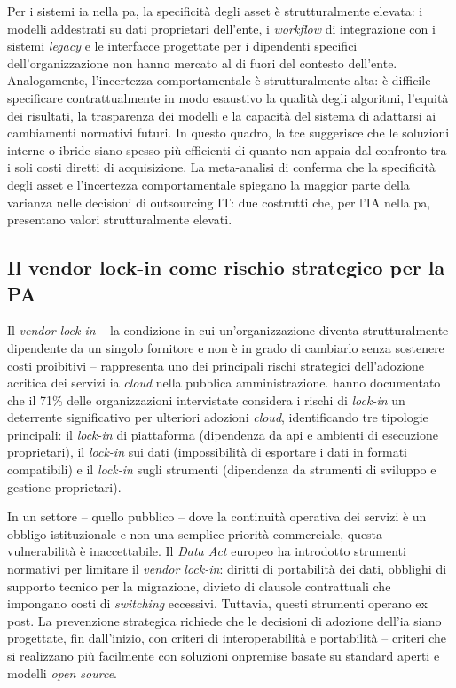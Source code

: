 Per i sistemi \gls{ia} nella \gls{pa}, la specificità degli asset è strutturalmente elevata: i modelli addestrati su dati proprietari dell'ente, i \textit{workflow} di integrazione con i sistemi \textit{legacy} e le interfacce progettate per i dipendenti specifici dell'organizzazione non hanno mercato al di fuori del contesto dell'ente. Analogamente, l'incertezza comportamentale è strutturalmente alta: è difficile specificare contrattualmente in modo esaustivo la qualità degli algoritmi, l'equità dei risultati, la trasparenza dei modelli e la capacità del sistema di adattarsi ai cambiamenti normativi futuri. In questo quadro, la \gls{tce} suggerisce che le soluzioni interne o ibride siano spesso più efficienti di quanto non appaia dal confronto tra i soli costi diretti di acquisizione. La meta-analisi di \textcite{Bahli2013} conferma che la specificità degli asset e l'incertezza comportamentale spiegano la maggior parte della varianza nelle decisioni di outsourcing IT: due costrutti che, per l'IA nella \gls{pa}, presentano valori strutturalmente elevati.

\subsection{Il vendor lock-in come rischio strategico per la PA}

Il \textit{vendor lock-in} -- la condizione in cui un'organizzazione diventa strutturalmente dipendente da un singolo fornitore e non è in grado di cambiarlo senza sostenere costi proibitivi -- rappresenta uno dei principali rischi strategici dell'adozione acritica dei servizi \gls{ia} \textit{cloud} nella pubblica amministrazione. \textcite{Opara2016} hanno documentato che il 71\% delle organizzazioni intervistate considera i rischi di \textit{lock-in} un deterrente significativo per ulteriori adozioni \textit{cloud}, identificando tre tipologie principali: il \textit{lock-in} di piattaforma (dipendenza da \gls{api} e ambienti di esecuzione proprietari), il \textit{lock-in} sui dati (impossibilità di esportare i dati in formati compatibili) e il \textit{lock-in} sugli strumenti (dipendenza da strumenti di sviluppo e gestione proprietari).

In un settore -- quello pubblico -- dove la continuità operativa dei servizi è un obbligo istituzionale e non una semplice priorità commerciale, questa vulnerabilità è inaccettabile. Il \textit{Data Act} europeo \parencite{DataAct2023} ha introdotto strumenti normativi per limitare il \textit{vendor lock-in}: diritti di portabilità dei dati, obblighi di supporto tecnico per la migrazione, divieto di clausole contrattuali che impongano costi di \textit{switching} eccessivi. Tuttavia, questi strumenti operano ex post. La prevenzione strategica richiede che le decisioni di adozione dell'\gls{ia} siano progettate, fin dall'inizio, con criteri di interoperabilità e portabilità -- criteri che si realizzano più facilmente con soluzioni \gls{onpremise} basate su standard aperti e modelli \textit{open source}.

